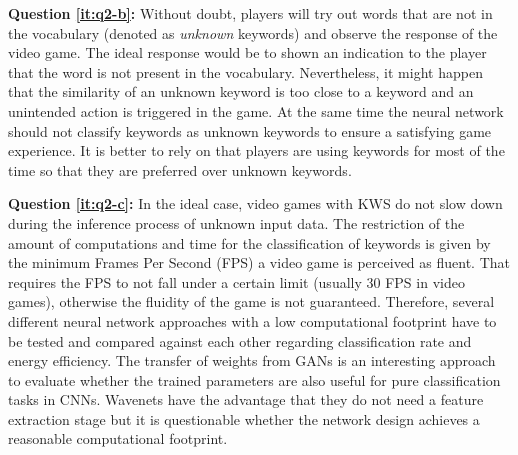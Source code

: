 \textbf{Question \ref{it:q2-b}:} 
Without doubt, players will try out words that are not in the vocabulary (denoted as \emph{unknown} keywords) and observe the response of the video game.
The ideal response would be to shown an indication to the player that the word is not present in the vocabulary. 
Nevertheless, it might happen that the similarity of an unknown keyword is too close to a keyword and an unintended action is triggered in the game. 
At the same time the neural network should not classify keywords as unknown keywords to ensure a satisfying game experience.
It is better to rely on that players are using keywords for most of the time so that they are preferred over unknown keywords.

\textbf{Question \ref{it:q2-c}:}
In the ideal case, video games with KWS do not slow down during the inference process of unknown input data.
The restriction of the amount of computations and time for the classification of keywords is given by the minimum Frames Per Second (FPS) a video game is perceived as fluent.
That requires the FPS to not fall under a certain limit (usually 30 FPS in video games), otherwise the fluidity of the game is not guaranteed.
Therefore, several different neural network approaches with a low computational footprint have to be tested and compared against each other regarding classification rate and energy efficiency.
The transfer of weights from GANs is an interesting approach to evaluate whether the trained parameters are also useful for pure classification tasks in CNNs.
Wavenets have the advantage that they do not need a feature extraction stage but it is questionable whether the network design achieves a reasonable computational footprint.



